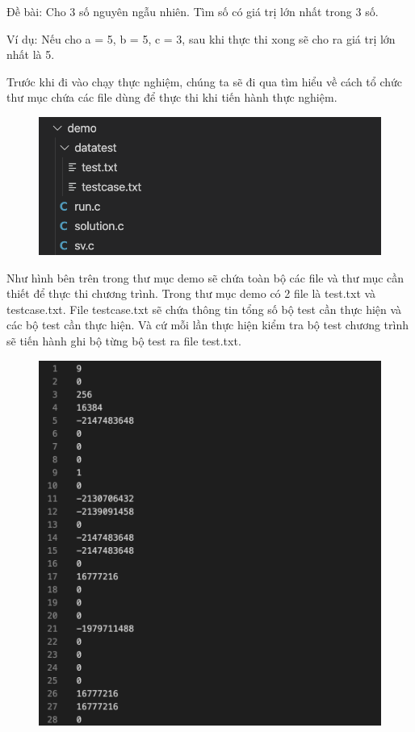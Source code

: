 \documentclass[12pt,a4paper]{report}
\begin{document}
Đề bài: Cho 3 số nguyên ngẫu nhiên. Tìm số có giá trị lớn nhất trong 3 số.

Ví dụ: Nếu cho a = 5, b = 5, c = 3, sau khi thực thi xong sẽ cho ra giá trị lớn nhất là 5.

Trước khi đi vào chạy thực nghiệm, chúng ta sẽ đi qua tìm hiểu về cách tổ chức thư mục chứa các file dùng để thực thi khi tiến hành thực nghiệm.

\begin{figure}[ht]
\begin{center}
\includegraphics[scale=.3]{hinhanh/cautrucfolder.png}
\end{center}
\end{figure}

Như hình bên trên trong thư mục demo sẽ chứa toàn bộ các file và thư mục cần thiết để thực thi chương trình. Trong thư mục demo có 2 file là test.txt và testcase.txt. File testcase.txt sẽ chứa thông tin tổng số bộ test cần thực hiện và các bộ test cần thực hiện. Và cứ mỗi lần thực hiện kiểm tra bộ test chương trình sẽ tiến hành ghi bộ từng bộ test ra file test.txt.

\begin{figure}[ht]
\begin{center}
\includegraphics[scale=.3]{hinhanh/testcase.png}
\end{center}
\end{figure}
\newpage
\end{document}
